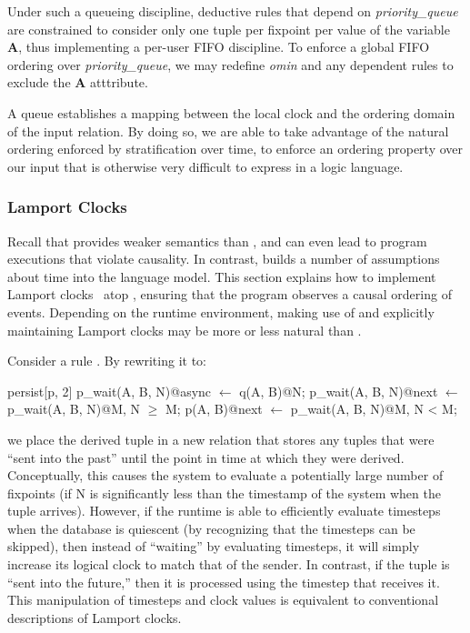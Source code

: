 Under such a queueing discipline, deductive rules that depend on
\emph{priority\_queue} are constrained to consider only one tuple per fixpoint
per value of the variable \textbf{A}, thus implementing a per-user FIFO
discipline.  To enforce a global FIFO ordering over \emph{priority\_queue}, we
may redefine \emph{omin} and any dependent rules to exclude the \textbf{A}
atttribute.

A queue establishes a mapping between the local clock and the ordering domain of the input relation. By doing so, we are able to take
advantage of the natural ordering enforced by stratification over time, to enforce an ordering property over our input that is otherwise 
very difficult to express in a logic language.

\subsubsection{Lamport Clocks}
Recall that  provides weaker semantics than
, and can even lead to program executions that violate
causality.  In contrast,  builds a number of
assumptions about time into the language model.  This section explains
how to implement Lamport clocks~\cite{timeclocks} atop
, ensuring that the program observes a causal ordering
of events.  Depending on the runtime environment, making use of
 and explicitly maintaining Lamport clocks may be more
or less natural than .

Consider a rule .  By
rewriting it to:

\begin{Dedalus}
persist[p, 2]
p\_wait(A, B, N)@async \(\leftarrow\) q(A, B)@N;
p\_wait(A, B, N)@next \(\leftarrow\) p\_wait(A, B, N)@M, N \(\ge\) M;
p(A, B)@next \(\leftarrow\) p\_wait(A, B, N)@M, N < M;
\end{Dedalus}

we place the derived tuple in a new relation  that
stores any tuples that were ``sent into the past'' until the point in
time at which they were derived.  Conceptually, this causes the system
to evaluate a potentially large number of fixpoints (if N is
significantly less than the timestamp of the system when the tuple
arrives).  However, if the runtime is able to efficiently evaluate
timesteps when the database is quiescent (by recognizing that the
timesteps can be skipped), then instead of ``waiting'' by evaluating
timesteps, it will simply increase its logical clock to match that of
the sender.  In contrast, if the tuple is ``sent into the future,''
then it is processed using the timestep that receives it.  This
manipulation of timesteps and clock values is equivalent to
conventional descriptions of Lamport clocks.



